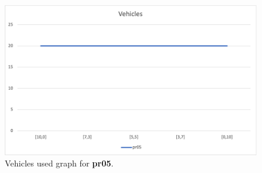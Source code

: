 \begin{figure}[H]
    \centering
    \includegraphics[height=0.25\textheight]{../graphs/pr05-vehicles.png}
    \caption{Vehicles used graph for \textbf{pr05}.}
\end{figure}

\newpage
